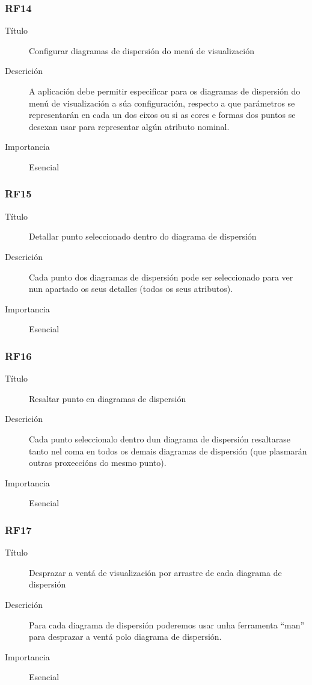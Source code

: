 \subsubsection*{RF14}
\begin{description}
\item[Título] \hfill
Configurar diagramas de dispersión do menú de visualización
\item[Descrición] \hfill
A aplicación debe permitir especificar para os diagramas de dispersión do menú de visualización a súa configuración, respecto a que parámetros se representarán en cada un dos eixos ou si as cores e formas dos puntos se desexan usar para representar algún atributo nominal.
\item[Importancia] \hfill
Esencial
\end{description}

\subsubsection*{RF15}
\begin{description}
\item[Título] \hfill
Detallar punto seleccionado dentro do diagrama de dispersión
\item[Descrición] \hfill
Cada punto dos diagramas de dispersión pode ser seleccionado para ver nun apartado os seus detalles (todos os seus atributos).
\item[Importancia] \hfill
Esencial
\end{description}

\subsubsection*{RF16}
\begin{description}
\item[Título] \hfill
Resaltar punto en diagramas de dispersión
\item[Descrición] \hfill
Cada punto seleccionalo dentro dun diagrama de dispersión resaltarase tanto nel coma en todos os demais diagramas de dispersión (que plasmarán outras proxeccións do mesmo punto).
\item[Importancia] \hfill
Esencial
\end{description}

\subsubsection*{RF17}
\begin{description}
\item[Título] \hfill
Desprazar a ventá de visualización por arrastre de cada diagrama de dispersión
\item[Descrición] \hfill
Para cada diagrama de dispersión poderemos usar unha ferramenta ``man'' para desprazar a ventá polo diagrama de dispersión.
\item[Importancia] \hfill
Esencial
\end{description}

